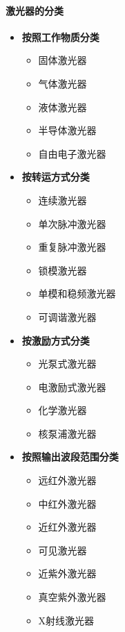 \paragraph{激光器的分类}
\begin{multicols}{2}
	\begin{itemize}
		\item \textbf{按照工作物质分类} 
			\begin{itemize}
				\item 固体激光器
				\item 气体激光器
				\item 液体激光器
				\item 半导体激光器
				\item 自由电子激光器
			\end{itemize} %
		\item \textbf{按转运方式分类}
			\begin{itemize}
				\item 连续激光器
				\item 单次脉冲激光器
				\item 重复脉冲激光器
				\item 锁模激光器
				\item 单模和稳频激光器
				\item 可调谐激光器
			\end{itemize} %
		\item \textbf{按激励方式分类}
			\begin{itemize}
				\item 光泵式激光器
				\item 电激励式激光器
				\item 化学激光器
				\item 核泵浦激光器
			\end{itemize} %
		\item \textbf{按照输出波段范围分类}
			\begin{itemize}
				\item 远红外激光器
				\item 中红外激光器
				\item 近红外激光器
				\item 可见激光器
				\item 近紫外激光器
				\item 真空紫外激光器
				\item X射线激光器
			\end{itemize} %
	\end{itemize}
\end{multicols}

